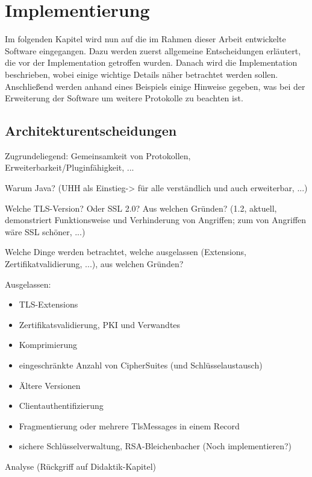 \chapter{Implementierung}

Im folgenden Kapitel wird nun auf die im Rahmen dieser Arbeit entwickelte Software eingegangen. Dazu werden zuerst allgemeine Entscheidungen erläutert, die vor der Implementation getroffen wurden. Danach wird die Implementation beschrieben, wobei einige wichtige Details näher betrachtet werden sollen. Anschließend werden anhand eines Beispiels einige Hinweise gegeben, was bei der Erweiterung der Software um weitere Protokolle zu beachten ist.

\section{Architekturentscheidungen}

\begin{mdframed}
Zugrundeliegend: Gemeinsamkeit von Protokollen, Erweiterbarkeit/Pluginfähigkeit, ...

Warum Java? (UHH als Einstieg-> für alle verständlich und auch erweiterbar, ...)

Welche TLS-Version? Oder SSL 2.0? Aus welchen Gründen? (1.2, aktuell, demonstriert Funktionsweise und Verhinderung von Angriffen; zum  von Angriffen wäre SSL schöner, ...)

Welche Dinge werden betrachtet, welche ausgelassen (Extensions, Zertifikatvalidierung, ...), aus welchen Gründen?

Ausgelassen:
\begin{itemize}
\item TLS-Extensions
\item Zertifikatsvalidierung, PKI und Verwandtes
\item Komprimierung
\item eingeschränkte Anzahl von CipherSuites (und Schlüsselaustausch)
\item Ältere Versionen
\item Clientauthentifizierung
\item Fragmentierung oder mehrere TlsMessages in einem Record
\item sichere Schlüsselverwaltung, RSA-Bleichenbacher (Noch implementieren?) 
\end{itemize}

Analyse (Rückgriff auf Didaktik-Kapitel)
\end{mdframed}

